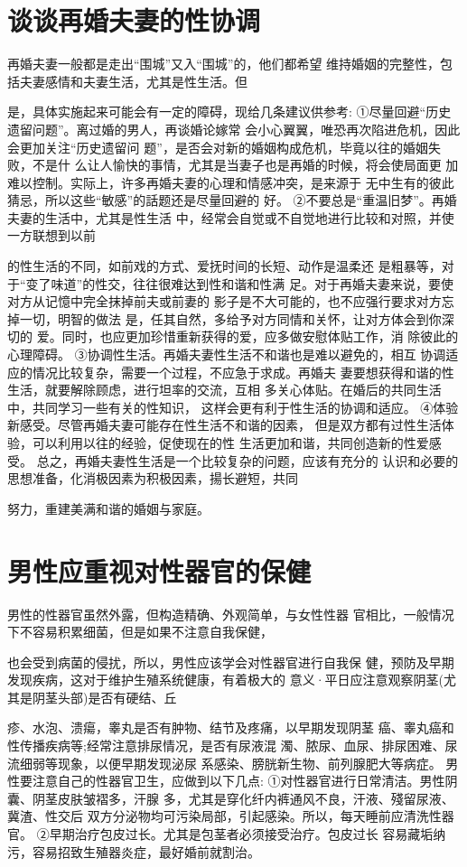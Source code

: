 \documentclass[12pt,UTF8]{ctexbook}
\begin{document}
\section{谈谈再婚夫妻的性协调}

再婚夫妻一般都是走出“围城”又入“围城”的，他们都希望
维持婚姻的完整性，包括夫妻感情和夫妻生活，尤其是性生活。但

是，具体实施起来可能会有一定的障碍，现给几条建议供参考:
①尽量回避“历史遗留问题”。离过婚的男人，再谈婚论嫁常
会小心翼翼，唯恐再次陷进危机，因此会更加关注“历史遗留问
题”，是否会对新的婚姻构成危机，毕竟以往的婚姻失败，不是什
么让人愉快的事情，尤其是当妻子也是再婚的时候，将会使局面更
加难以控制。实际上，许多再婚夫妻的心理和情感冲突，是来源于
无中生有的彼此猜忌，所以这些“敏感”的話题还是尽量回避的
好。
②不要总是“重温旧梦”。再婚夫妻的生活中，尤其是性生活
中，经常会自觉或不自觉地进行比较和对照，并使一方联想到以前

的性生活的不同，如前戏的方式、爱抚时间的长短、动作是温柔还
是粗暴等，对于“变了味道”的性交，往往很难达到性和谐和性满
足。对于再婚夫妻来说，要使对方从记憶中完全抹掉前夫或前妻的
影子是不大可能的，也不应强行要求对方忘掉一切，明智的做法
是，任其自然，多给予对方同情和关怀，让对方体会到你深切的
爱。同时，也应更加珍惜重新获得的爱，应多做安慰体贴工作，消
除彼此的心理障碍。
③协调性生活。再婚夫妻性生活不和谐也是难以避免的，相互
协调适应的情况比较复杂，需要一个过程，不应急于求成。再婚夫
妻要想获得和谐的性生活，就要解除顾虑，进行坦率的交流，互相
多关心体贴。在婚后的共同生活中，共同学习一些有关的性知识，
这样会更有利于性生活的协调和适应。
④体验新感受。尽管再婚夫妻可能存在性生活不和谐的因素，
但是双方都有过性生活体验，可以利用以往的经验，促使现在的性
生活更加和谐，共同创造新的性爱感受。
总之，再婚夫妻性生活是一个比较复杂的问题，应该有充分的
认识和必要的思想准备，化消极因素为积极因素，揚长避短，共同

努力，重建美满和谐的婚姻与家庭。

\section{男性应重视对性器官的保健}

男性的性器官虽然外露，但构造精确、外观简单，与女性性器
官相比，一般情况下不容易积累细菌，但是如果不注意自我保健，

也会受到病菌的侵扰，所以，男性应该学会对性器官进行自我保
健，预防及早期发现疾病，这对于维护生殖系统健康，有着极大的
意义·平日应注意观察阴茎(尤其是阴茎头部)是否有硬结、丘

疹、水泡、溃瘍，睾丸是否有肿物、结节及疼痛，以早期发现阴茎
癌、睾丸癌和性传播疾病等;经常注意排尿情况，是否有尿液混
濁、脓尿、血尿、排尿困难、尿流细弱等现象，以便早期发现泌尿
系感染、膀胱新生物、前列腺肥大等病症。
男性要注意自己的性器官卫生，应做到以下几点:
①对性器官进行日常清洁。男性阴囊、阴茎皮肤皱褶多，汗腺
多，尤其是穿化纤内裤通风不良，汗液、殘留尿液、冀渣、性交后
双方分泌物均可污染局部，引起感染。所以，每天睡前应清洗性器
官。
②早期治疗包皮过长。尤其是包茎者必须接受治疗。包皮过长
容易藏垢纳污，容易招致生殖器炎症，最好婚前就割治。
\end{document}
